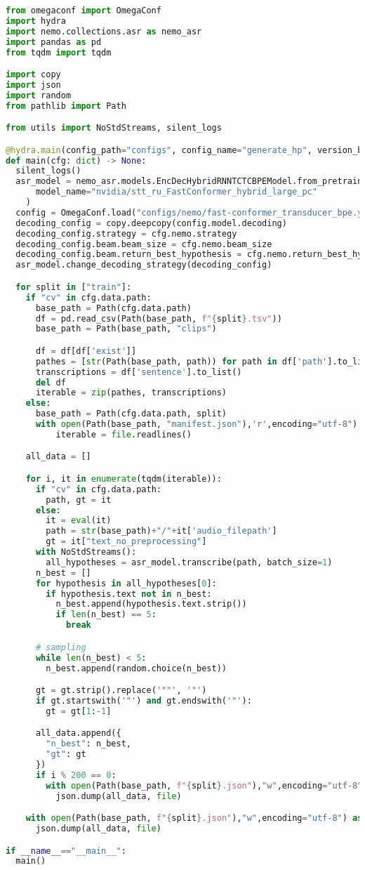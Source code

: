 \begin{lstlisting}[language=Python,label={lst:generate},caption=generate\_hypotheses.py,breaklines=true,]
from omegaconf import OmegaConf
import hydra
import nemo.collections.asr as nemo_asr
import pandas as pd
from tqdm import tqdm

import copy
import json
import random
from pathlib import Path

from utils import NoStdStreams, silent_logs

@hydra.main(config_path="configs", config_name="generate_hp", version_base="1.3")
def main(cfg: dict) -> None:
  silent_logs()
  asr_model = nemo_asr.models.EncDecHybridRNNTCTCBPEModel.from_pretrained(
      model_name="nvidia/stt_ru_FastConformer_hybrid_large_pc"
    )
  config = OmegaConf.load("configs/nemo/fast-conformer_transducer_bpe.yaml")
  decoding_config = copy.deepcopy(config.model.decoding)
  decoding_config.strategy = cfg.nemo.strategy
  decoding_config.beam.beam_size = cfg.nemo.beam_size
  decoding_config.beam.return_best_hypothesis = cfg.nemo.return_best_hypothesis
  asr_model.change_decoding_strategy(decoding_config)

  for split in ["train"]:
    if "cv" in cfg.data.path:
      base_path = Path(cfg.data.path)
      df = pd.read_csv(Path(base_path, f"{split}.tsv"))
      base_path = Path(base_path, "clips")

      df = df[df['exist']]
      pathes = [str(Path(base_path, path)) for path in df['path'].to_list()]
      transcriptions = df['sentence'].to_list()
      del df
      iterable = zip(pathes, transcriptions)
    else:
      base_path = Path(cfg.data.path, split)
      with open(Path(base_path, "manifest.json"),'r',encoding="utf-8") as file:
          iterable = file.readlines()

    all_data = []

    for i, it in enumerate(tqdm(iterable)):
      if "cv" in cfg.data.path:
        path, gt = it
      else:
        it = eval(it)
        path = str(base_path)+"/"+it['audio_filepath']
        gt = it["text_no_preprocessing"]
      with NoStdStreams():
        all_hypotheses = asr_model.transcribe(path, batch_size=1)
      n_best = []
      for hypothesis in all_hypotheses[0]:
        if hypothesis.text not in n_best:
          n_best.append(hypothesis.text.strip())
          if len(n_best) == 5:
            break

      # sampling
      while len(n_best) < 5:
        n_best.append(random.choice(n_best))

      gt = gt.strip().replace('""', '"')
      if gt.startswith('"') and gt.endswith('"'):
        gt = gt[1:-1]

      all_data.append({
        "n_best": n_best,
        "gt": gt
      })
      if i % 200 == 0:
        with open(Path(base_path, f"{split}.json"),"w",encoding="utf-8") as file:
          json.dump(all_data, file)

    with open(Path(base_path, f"{split}.json"),"w",encoding="utf-8") as file:
      json.dump(all_data, file)

if __name__=="__main__":
  main()
\end{lstlisting}

